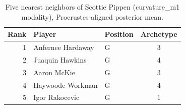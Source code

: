 \begin{table}[htbp]
  \centering\small
  \begin{tabular}{rllc}
    \toprule
    Rank & Player & Position & Archetype \\
    \midrule
    1 & Anfernee Hardaway & G & 3 \\
    2 & Juaquin Hawkins & G & 4 \\
    3 & Aaron McKie & G & 3 \\
    4 & Haywoode Workman & G & 4 \\
    5 & Igor Rakocevic & G & 1 \\
    \bottomrule
  \end{tabular}
  \caption{Five nearest neighbors of Scottie Pippen (curvature_m1 modality), Procrustes-aligned posterior mean.}
  \label{tab:Scottie_Pippen_neighbors_curvature_m1}
\end{table}

